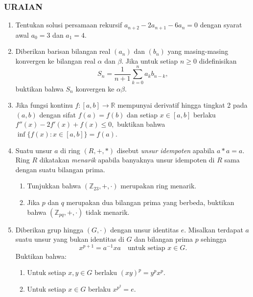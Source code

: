 \documentclass[12pt,twoside]{article}
\begin{document}
\subsubsection*{URAIAN}
\begin{enumerate}
	\item Tentukan solusi persamaan rekursif
	      $
		      a_{n+2} - 2a_{n+1} - 6a_n = 0
	      $
	      dengan syarat awal $a_0 = 3$ dan $a_1 = 4$.

	\item Diberikan barisan bilangan real $(a_n)$ dan $(b_n)$ yang masing-masing konvergen ke bilangan real $\alpha$ dan $\beta$. Jika untuk setiap $n \ge 0$ didefinisikan
	      \[
		      S_n = \frac{1}{n+1} \sum_{k=0}^{n} a_k b_{n-k},
	      \]
	      buktikan bahwa $S_n$ konvergen ke $\alpha \beta$.

	\item Jika fungsi kontinu $f:[a,b]\to\mathbb{R}$ mempunyai derivatif hingga tingkat 2 pada $(a,b)$ dengan sifat
	      $
		      f(a)=f(b)
	      $
	      dan setiap $x \in [a,b]$ berlaku
	      $
		      f''(x) - 2f'(x) + f(x) \le 0,
	      $
	      buktikan bahwa
	      $
		      \inf\{f(x): x\in [a,b]\} = f(a).
	      $

	\item Suatu unsur $a$ di ring $(R,+,\ast)$ disebut \emph{unsur idempoten} apabila $a\ast a=a$.
	      Ring $R$ dikatakan \emph{menarik} apabila banyaknya unsur idempoten di $R$ sama dengan suatu bilangan prima.

	      \begin{enumerate}
		      \item Tunjukkan bahwa $(\mathbb{Z}_{23}, +, \cdot)$ merupakan ring menarik.

		      \item Jika $p$ dan $q$ merupakan dua bilangan prima yang berbeda, buktikan bahwa $(\mathbb{Z}_{pq}, +, \cdot)$ tidak menarik.
	      \end{enumerate}

	\item Diberikan grup hingga $(G,\cdot)$ dengan unsur identitas $e$.
	      Misalkan terdapat $a$ suatu unsur yang bukan identitas di $G$ dan bilangan prima $p$ sehingga
	      \[
		      x^{p+1} = a^{-1} x a \quad \text{untuk setiap } x\in G.
	      \]
	      Buktikan bahwa:
	      \begin{enumerate}
		      \item Untuk setiap $x,y\in G$ berlaku $(xy)^p = y^p x^p$.
		      \item Untuk setiap $x\in G$ berlaku $x^{p^2} = e$.
	      \end{enumerate}
\end{enumerate}
\end{document}
